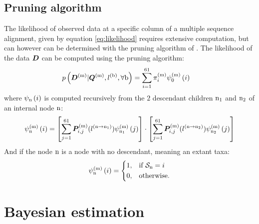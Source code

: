 \subsection{Pruning algorithm}
The \gls{likelihood} of observed data at a specific column of a multiple sequence alignment, given by equation \ref{eq:likelihood} requires extensive computation, but can however can be determined with the pruning algorithm of \citet{Felsenstein1985}. 
The \gls{likelihood} of the data $\bm{D}$ can be computed using the pruning algorithm:
\begin{align}
p\left(\bm{D}^{(\text{m})}| \bm{Q}^{(\text{m})}, l^{(\text{b})}, \forall \text{b} \right) & = \sum\limits_{{i}=1}^{61} \pi^{(\text{m})}_{{i}} \psi^{(\text{m})}_{0} \left( {i} \right)
\end{align}
where $\psi_{\text{n}} \left( {i} \right)$ is computed recursively from the $2$ descendant children $\text{n}_{1}$ and $\text{n}_{2}$ of an internal node $\text{n}$:
\begin{align}
\psi^{(\text{m})}_{\text{n}} \left( {i} \right) = 
\left[ \sum\limits_{{j}=1}^{61}\bm{P}^{(\text{m})}_{{i}, {j}}(l^{(\text{n} \to \text{n}_{1})}) \psi^{(\text{m})}_{\text{n}_{1}} \left( {j} \right) \right]
\cdot 
\left[ \sum\limits_{{j}=1}^{61}\bm{P}^{(\text{m})}_{{i}, {j}}(l^{(\text{n} \to \text{n}_{2})}) \psi^{(\text{m})}_{\text{n}_{2}} \left( {j} \right) \right]
\end{align}
And if the node $\text{n}$ is a node with no descendant, meaning an extant taxa:
\begin{align}
\psi^{(\text{m})}_{\text{n}} \left( {i} \right) =
\begin{dcases}
1, & \text{if } \mathcal{S}_{\text{n}} = {i} \\
0, & \text{otherwise.}
\end{dcases}
\end{align}

\section{Bayesian estimation}
\label{sec:intro-bayesian}

